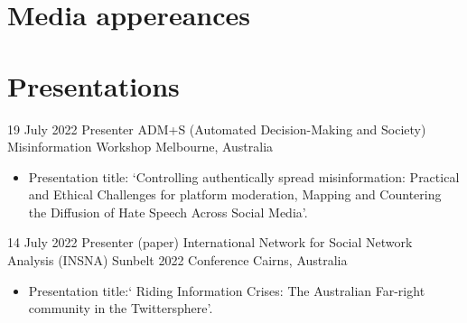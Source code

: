 \documentclass[11pt,a4paper,sans]{moderncv}
\begin{document}

\section{Media appereances}













\section{Presentations}

 
\cventry %
{19 July 2022}
{Presenter}
{ADM+S (Automated Decision-Making and Society) Misinformation Workshop}
{Melbourne, Australia}
{}
      {
      \begin{itemize} %
        \item {Presentation title: `Controlling authentically spread misinformation: Practical and Ethical
Challenges for platform moderation, Mapping and Countering the Diffusion of Hate Speech Across Social Media'.}
      \end{itemize}
    }

\cventry %
{14 July 2022}
{Presenter (paper)}
{International Network for Social Network Analysis (INSNA) Sunbelt 2022 Conference}
{Cairns, Australia}
{}
       {
      \begin{itemize} %
        \item {Presentation title:` Riding Information Crises: The
            Australian Far-right community in the Twittersphere'.}
      \end{itemize}
    }
\end{document}
